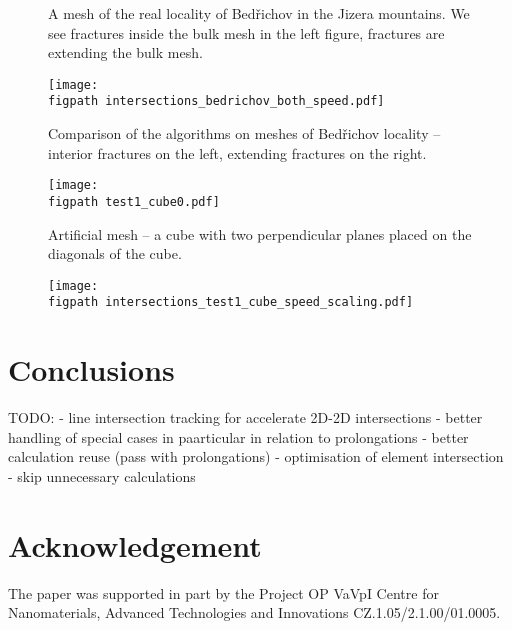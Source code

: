 \documentclass{elsarticle}
\newcommand{\figpath}{figures/}
\begin{document}
\begin{figure}[!htb]
    \hspace{3pt}
    \caption{A mesh of the real locality of Bed{\v r}ichov in the Jizera mountains.
             We see fractures inside the bulk mesh in the left figure,
             fractures are extending the bulk mesh.}
    \label{fig:bedrichov_meshes}
\end{figure}


\begin{figure}[!htb]
    \centering
    \texttt{[image: \\figpath intersections\_bedrichov\_both\_speed.pdf]}
    \caption{Comparison of the algorithms on meshes of Bed{\v r}ichov locality -- interior fractures on the left,
             extending fractures on the right.}
    \label{fig:bedrichov_speed}
\end{figure}

\begin{figure}[!htb]
    \centering
    \texttt{[image: \\figpath test1\_cube0.pdf]}
    \caption{Artificial mesh -- a cube with two perpendicular planes placed on the diagonals of the cube.}
    \label{fig:cube_mesh}
\end{figure}
  
\begin{figure}[!htb]
    \centering
    \texttt{[image: \\figpath intersections\_test1\_cube\_speed\_scaling.pdf]}
    \caption{}
    \label{fig:cube_speed}
\end{figure}



\section{Conclusions}
TODO:
- line intersection tracking for accelerate 2D-2D intersections
- better handling of special cases in paarticular in relation to prolongations
- better calculation reuse (pass with prolongations)
- optimisation of element intersection - skip unnecessary calculations
\section{Acknowledgement}
The paper was supported in part by the Project OP
VaVpI Centre for Nanomaterials, Advanced Technologies  and Innovations
CZ.1.05/2.1.00/01.0005.
\end{document}
